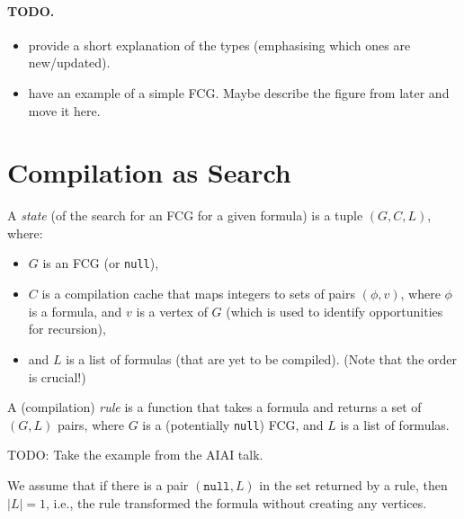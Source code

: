 \paragraph{TODO.}
\begin{itemize}
\item provide a short explanation of the types (emphasising which ones are new/updated). %
\item have an example of a simple FCG. Maybe describe the figure from later and move it here.
\end{itemize}

\section{Compilation as Search}

\begin{definition}
  A \emph{state} (of the search for an FCG for a given formula) is a tuple $(G, C, L)$, where:
  \begin{itemize}
  \item $G$ is an FCG (or \texttt{null}),
  \item $C$ is a compilation cache that maps integers to sets of pairs $(\phi, v)$, where $\phi$ is a formula, and $v$ is a vertex of $G$ (which is used to identify opportunities for recursion),
  \item and $L$ is a list of formulas (that are yet to be compiled). (Note that the order is crucial!)
  \end{itemize}
\end{definition}

\begin{definition}
  A (compilation) \emph{rule} is a function that takes a formula and returns a set of $(G, L)$ pairs, where $G$ is a (potentially \texttt{null}) FCG, and $L$ is a list of formulas.

  TODO: Take the example from the AIAI talk.
\end{definition}

We assume that if there is a pair $(\texttt{null}, L)$ in the set returned by a rule, then $|L| = 1$, i.e., the rule transformed the formula without creating any vertices.


